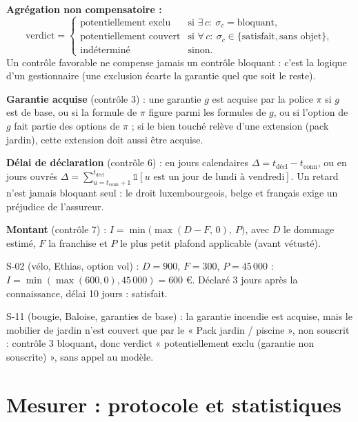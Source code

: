 \documentclass[11pt,a4paper]{article}
\begin{document}
\textbf{Agrégation non compensatoire :}
\[
\text{verdict} =
\begin{cases}
\text{potentiellement exclu} & \text{si } \exists\, c:\ \sigma_c = \text{bloquant},\\
\text{potentiellement couvert} & \text{si } \forall\, c:\ \sigma_c \in\{\text{satisfait},\text{sans objet}\},\\
\text{indéterminé} & \text{sinon.}
\end{cases}
\]
Un contrôle favorable ne compense jamais un contrôle bloquant : c'est la logique d'un gestionnaire
(une exclusion écarte la garantie quel que soit le reste).

\textbf{Garantie acquise} (contrôle 3) : une garantie $g$ est acquise par la police $\pi$ si
$g$ est de base, ou si la formule de $\pi$ figure parmi les formules de $g$, ou si l'option de
$g$ fait partie des options de $\pi$ ; si le bien touché relève d'une extension (pack jardin), cette
extension doit aussi être acquise.

\textbf{Délai de déclaration} (contrôle 6) : en jours calendaires $\Delta = t_{\text{décl}}-t_{\text{conn}}$,
ou en jours ouvrés $\Delta = \sum_{u=t_{\text{conn}}+1}^{t_{\text{décl}}}\mathbb{1}[u \text{ est un jour de lundi à vendredi}]$.
Un retard n'est jamais bloquant seul : le droit luxembourgeois, belge et français exige un
préjudice de l'assureur.

\textbf{Montant} (contrôle 7) : $I = \min\big(\max(D - F,\,0),\ P\big)$, avec $D$ le dommage
estimé, $F$ la franchise et $P$ le plus petit plafond applicable (avant vétusté).

\begin{exemple}
S-02 (vélo, Ethias, option vol) : $D=900$, $F=300$, $P=45\,000$ :
$I=\min(\max(600,0),45\,000)=600$ €. Déclaré 3 jours après la connaissance, délai 10 jours :
satisfait.

S-11 (bougie, Baloise, garanties de base) : la garantie incendie est acquise, mais le mobilier de
jardin n'est couvert que par le « Pack jardin / piscine », non souscrit : contrôle 3 bloquant,
donc verdict « potentiellement exclu (garantie non souscrite) », sans appel au modèle.
\end{exemple}

\section{Mesurer : protocole et statistiques}
\end{document}
